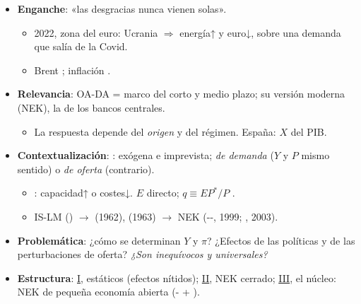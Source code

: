 \documentclass{article}
\begin{document}
\cabecerarepaso
\begin{columnas}

\begin{itemize}
\item \textbf{Enganche}: «las desgracias nunca vienen solas».
  \begin{itemize}
  \item 2022, zona del euro: Ucrania $\Rightarrow$ energía↑ y euro↓, sobre una demanda que salía de la Covid.
  \item Brent ; inflación .
  \end{itemize}
\item \textbf{Relevancia}: OA-DA = marco del corto y medio plazo; su versión moderna (NEK), la de los bancos centrales.
  \begin{itemize}
  \item La respuesta depende del \emph{origen} y del régimen. España: $X$  del PIB.
  \end{itemize}
\item \textbf{Contextualización}: : exógena e imprevista; \emph{de demanda} ($Y$ y $P$ mismo sentido) o \emph{de oferta} (contrario).
  \begin{itemize}
  \item {}: capacidad↑ o costes↓. $E$ directo; $q\equiv EP^*/P$ .
  \item IS-LM () $\to$  (1962),  (1963) $\to$ NEK (--, 1999; , 2003).
  \end{itemize}
\item \textbf{Problemática}: ¿cómo se determinan $Y$ y $\pi$? ¿Efectos de las políticas y de las perturbaciones de oferta? \emph{¿Son inequívocos y universales?}
\item \textbf{Estructura}: \hyperref[rep:I]{I}, estáticos (efectos nítidos); \hyperref[rep:II]{II}, NEK cerrado; \hyperref[rep:III]{III}, el núcleo: NEK de pequeña economía abierta (- + ).
\end{itemize}


\end{columnas}
\end{document}

